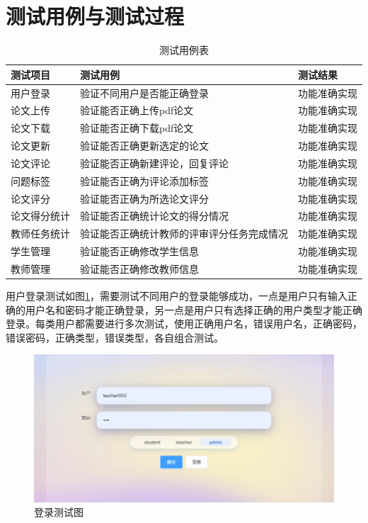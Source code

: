 \section{测试用例与测试过程}

\begin{table}[htbp]
  \centering
  \song\wuhao
  \caption{ 测试用例表 }
  \label{test-usecase-table}
\begin{tabular}{lll}
\hline
测试项目   & 测试用例                  & 测试结果   \\ \hline
用户登录   & 验证不同用户是否能正确登录         & 功能准确实现 \\
论文上传   & 验证能否正确上传pdf论文         & 功能准确实现 \\
论文下载   & 验证能否正确下载pdf论文         & 功能准确实现 \\
论文更新   & 验证能否正确更新选定的论文         & 功能准确实现 \\
论文评论   & 验证能否正确新建评论，回复评论       & 功能准确实现 \\
问题标签   & 验证能否正确为评论添加标签         & 功能准确实现 \\
论文评分   & 验证能否正确为所选论文评分         & 功能准确实现 \\
论文得分统计 & 验证能否正确统计论文的得分情况       & 功能准确实现 \\
教师任务统计 & 验证能否正确统计教师的评审评分任务完成情况 & 功能准确实现 \\
学生管理   & 验证能否正确修改学生信息          & 功能准确实现 \\
教师管理   & 验证能否正确修改教师信息          & 功能准确实现 \\ \hline
\end{tabular}
\end{table}

用户登录测试如图\ref{login-test}，需要测试不同用户的登录能够成功，一点是用户只有输入正确的用户名和密码才能正确登录，另一点是用户只有选择正确的用户类型才能正确登录。每类用户都需要进行多次测试，使用正确用户名，错误用户名，正确密码，错误密码，正确类型，错误类型，各自组合测试。

\begin{figure}[htbp]
  \centering
  \includegraphics[scale = 0.57]{out/figure/测试/login-test.png}
  \caption{\song\wuhao 登录测试图}
  \label{login-test}
\end{figure}

